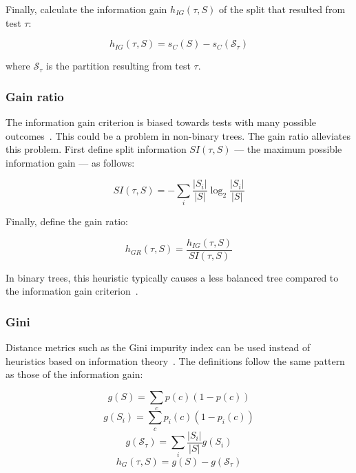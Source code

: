 Finally, calculate the information gain $h_{IG}(\tau, S)$ of the split that resulted from test $\tau$:

\begin{equation}
    h_{IG}(\tau, S) = s_C(S) - s_C(\mathcal{S}_\tau)
\end{equation}

where $\mathcal{S}_\tau$ is the partition resulting from test $\tau$.

\subsubsection{Gain ratio}
The information gain criterion is biased towards tests with many possible outcomes~\cite{harris2002information}. This could be a problem in non-binary trees. The gain ratio alleviates this problem. First define split information $SI(\tau, S)$ --- the maximum possible information gain --- as follows:

\begin{equation}
    SI(\tau, S) = - \sum_i \frac{|S_i|}{|S|} \log_2 \frac{|S_i|}{|S|}
\end{equation}

Finally, define the gain ratio:

\begin{equation}
    h_{GR}(\tau, S) = \frac{h_{IG}(\tau, S)}{SI(\tau, S)}
\end{equation}

In binary trees, this heuristic typically causes a less balanced tree compared to the information gain criterion~\cite{c45}.

\subsubsection{Gini}
Distance metrics such as the Gini impurity index can be used instead of heuristics based on information theory~\cite{cart}. The definitions follow the same pattern as those of the information gain:

\begin{equation}
    g(S) = \sum_c p(c)(1 - p(c))
\end{equation}
\begin{equation}
    g(S_i) = \sum_c p_i(c)(1-p_i(c))
\end{equation}
\begin{equation}
    g(\mathcal{S}_\tau) = \sum_i \frac{|S_i|}{|S|} g(S_i)
\end{equation}
\begin{equation}
    h_G(\tau, S) = g(S) - g(\mathcal{S}_\tau)
\end{equation}

